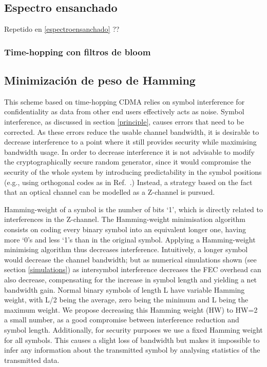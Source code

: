 \documentclass[a4paper,10pt]{report}
\begin{document}
\subsection{Espectro ensanchado}

Repetido en \ref{espectroensanchado} ??
\subsubsection{Time-hopping con filtros de bloom}

\subsection{Minimización de peso de Hamming}
This scheme based on time-hopping CDMA relies on symbol interference for confidentiality as data from other end users effectively acts as noise.
Symbol interference, as discussed in section \ref{principle}, causes errors that need to be corrected.
As these errors reduce the usable channel bandwidth, it is desirable to decrease interference to a point where it still provides security while maximising bandwidth usage.
In order to decrease interference it is not advisable to modify the cryptographically secure random generator, since it would compromise the security of the whole system by introducing predictability in the symbol positions (e.g., using orthogonal codes as in Ref.~\cite{Nadarajah2006}.)
Instead, a strategy based on the fact that an optical channel can be modelled as a Z-channel is pursued.

Hamming-weight of a symbol is the number of bits `1', which is directly related to interferences in the Z-channel.
The Hamming-weight minimisation algorithm consists on coding every binary symbol into an equivalent longer one, having more `0's and less `1's than in the original symbol.
Applying a Hamming-weight minimising algorithm thus decreases interference.
Intuitively, a longer symbol would decrease the channel bandwidth; but as numerical simulations shown (see section \ref{simulations}) as intersymbol interference decreases the FEC overhead can also decrease, compensating for the increase in symbol length and yielding a net bandwidth gain.
Normal binary symbols of length L have variable Hamming weight, with L/2 being the average, zero being the minimum and L being the maximum weight.
We propose decreasing this Hamming weight (HW) to HW=2 a small number, as a good compromise between interference reduction and symbol length.
Additionally, for security purposes we use a fixed Hamming weight for all symbols. This causes a slight loss of bandwidth but makes it impossible to infer any information about the transmitted symbol by analysing statistics of the transmitted data.
\end{document}
